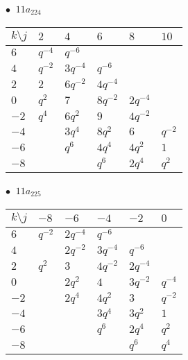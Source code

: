 \begin{minipage}{\linewidth}
$\bullet\ $ $11a_{224}$ \vspace{0.5em} \\
\begin{tabular}{l|lllll}
$k \setminus j$ & $2$ & $4$ & $6$ & $8$ & $10$ \\
\hline
$6$ & $q^{-4}$ & $q^{-6}$ &  &  &  \\
$4$ & $q^{-2}$ & $3q^{-4}$ & $q^{-6}$ &  &  \\
$2$ & $2$ & $6q^{-2}$ & $4q^{-4}$ &  &  \\
$0$ & $q^{2}$ & $7$ & $8q^{-2}$ & $2q^{-4}$ &  \\
$-2$ & $q^{4}$ & $6q^{2}$ & $9$ & $4q^{-2}$ &  \\
$-4$ &  & $3q^{4}$ & $8q^{2}$ & $6$ & $q^{-2}$ \\
$-6$ &  & $q^{6}$ & $4q^{4}$ & $4q^{2}$ & $1$ \\
$-8$ &  &  & $q^{6}$ & $2q^{4}$ & $q^{2}$ \\
\end{tabular}
\vspace{2em}
\end{minipage}
%
\begin{minipage}{\linewidth}
$\bullet\ $ $11a_{225}$ \vspace{0.5em} \\
\begin{tabular}{l|lllll}
$k \setminus j$ & $-8$ & $-6$ & $-4$ & $-2$ & $0$ \\
\hline
$6$ & $q^{-2}$ & $2q^{-4}$ & $q^{-6}$ &  &  \\
$4$ &  & $2q^{-2}$ & $3q^{-4}$ & $q^{-6}$ &  \\
$2$ & $q^{2}$ & $3$ & $4q^{-2}$ & $2q^{-4}$ &  \\
$0$ &  & $2q^{2}$ & $4$ & $3q^{-2}$ & $q^{-4}$ \\
$-2$ &  & $2q^{4}$ & $4q^{2}$ & $3$ & $q^{-2}$ \\
$-4$ &  &  & $3q^{4}$ & $3q^{2}$ & $1$ \\
$-6$ &  &  & $q^{6}$ & $2q^{4}$ & $q^{2}$ \\
$-8$ &  &  &  & $q^{6}$ & $q^{4}$ \\
\end{tabular}
\vspace{2em}
\end{minipage}
%
